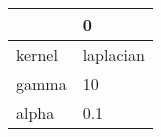 \begin{tabular}{ll}
\toprule
{} &          0 \\
\midrule
kernel &  laplacian \\
gamma  &         10 \\
alpha  &        0.1 \\
\bottomrule
\end{tabular}
